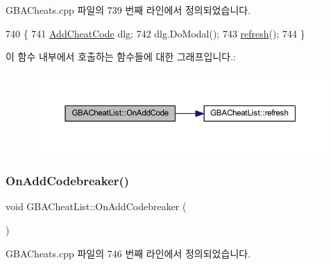 G\+B\+A\+Cheats.\+cpp 파일의 739 번째 라인에서 정의되었습니다.


\begin{DoxyCode}
740 \{
741   \mbox{\hyperlink{class_add_cheat_code}{AddCheatCode}} dlg;
742   dlg.DoModal();
743   \mbox{\hyperlink{class_g_b_a_cheat_list_a12928bb674926ae02d5a3ceb156a3b53}{refresh}}();
744 \}
\end{DoxyCode}
이 함수 내부에서 호출하는 함수들에 대한 그래프입니다.\+:
\nopagebreak
\begin{figure}[H]
\begin{center}
\leavevmode
\includegraphics[width=350pt]{class_g_b_a_cheat_list_a6ac13ccfe979786032de5a836e9c35a6_cgraph}
\end{center}
\end{figure}
\mbox{\label{class_g_b_a_cheat_list_a06eeb598a3bfdccf747014a7d3c996dc}} 
\subsubsection{\texorpdfstring{On\+Add\+Codebreaker()}{OnAddCodebreaker()}}
{\footnotesize\ttfamily void G\+B\+A\+Cheat\+List\+::\+On\+Add\+Codebreaker (\begin{DoxyParamCaption}{ }\end{DoxyParamCaption})\hspace{0.3cm}{\ttfamily [protected]}}



G\+B\+A\+Cheats.\+cpp 파일의 746 번째 라인에서 정의되었습니다.


